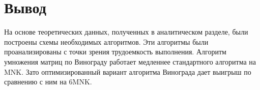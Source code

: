 \begin{itemize}
	\begin{figure}[H]
	\end{figure}

	\begin{figure}[H]
	\end{figure}
\end{itemize}

\section{Вывод}
На основе теоретических данных, полученных в аналитическом разделе, были построены схемы необходимых алгоритмов. Эти алгоритмы были проанализированы с точки зрения трудоемкость выполнения. Алгоритм умножения матриц по Винограду работает медленнее стандартного алгоритма на MNK. Зато оптимизированный вариант алгоритма  Винограда дает выигрыш по сравнению с ним на 6MNK.